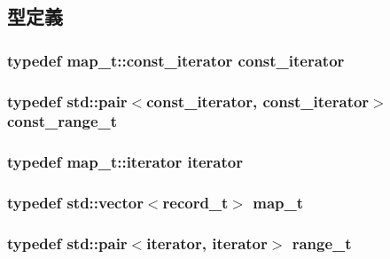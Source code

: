 \subsection{型定義}
\hypertarget{classPCEventQueue_a1b1044fb589ffa9451ee2a57f7649293}{
\subsubsection[{const\_\-iterator}]{\setlength{\rightskip}{0pt plus 5cm}typedef map\_\-t::const\_\-iterator {\bf const\_\-iterator}}}
\label{classPCEventQueue_a1b1044fb589ffa9451ee2a57f7649293}
\hypertarget{classPCEventQueue_a370a51098cf287e4725f0d54462fa1b5}{
\subsubsection[{const\_\-range\_\-t}]{\setlength{\rightskip}{0pt plus 5cm}typedef {\bf std::pair}$<${\bf const\_\-iterator}, {\bf const\_\-iterator}$>$ {\bf const\_\-range\_\-t}}}
\label{classPCEventQueue_a370a51098cf287e4725f0d54462fa1b5}
\hypertarget{classPCEventQueue_a02720ab92b997d08a475408a87a9a378}{
\subsubsection[{iterator}]{\setlength{\rightskip}{0pt plus 5cm}typedef map\_\-t::iterator {\bf iterator}}}
\label{classPCEventQueue_a02720ab92b997d08a475408a87a9a378}
\hypertarget{classPCEventQueue_a5ea93a71647f298ad98b01e4aa156721}{
\subsubsection[{map\_\-t}]{\setlength{\rightskip}{0pt plus 5cm}typedef {\bf std::vector}$<${\bf record\_\-t}$>$ {\bf map\_\-t}}}
\label{classPCEventQueue_a5ea93a71647f298ad98b01e4aa156721}
\hypertarget{classPCEventQueue_a25395d8f6c965039772100efce59edcb}{
\subsubsection[{range\_\-t}]{\setlength{\rightskip}{0pt plus 5cm}typedef {\bf std::pair}$<${\bf iterator}, {\bf iterator}$>$ {\bf range\_\-t}}}
